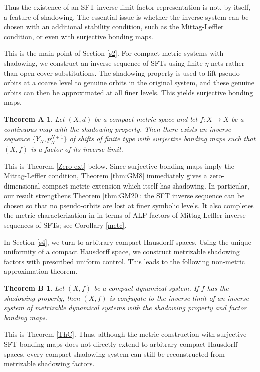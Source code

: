\documentclass[10pt,a4paper]{amsart}
\numberwithin{equation}{section}
\newtheorem*{theoremA}{Theorem A}
\newtheorem*{theoremB}{Theorem B}
\begin{document}
Thus the existence of an SFT inverse-limit factor representation is not, by
itself, a feature of shadowing. The essential issue is whether the inverse system
can be chosen with an additional stability condition, such as the
Mittag-Leffler condition, or even with surjective bonding maps.

This is the main point of Section \ref{s2}. For compact metric systems with
shadowing, we construct an inverse sequence of SFTs using finite $\eta$-nets
rather than open-cover substitutions. The shadowing property is used to lift
pseudo-orbits at a coarse level to genuine orbits in the original system, and
these genuine orbits can then be approximated at all finer levels. This yields
surjective bonding maps.

\begin{theoremA}
\emph{Let $(X,d)$ be a compact metric space and let $f:X\to X$ be a continuous map
with the shadowing property. Then there exists an inverse sequence
$\{Y_N,p_N^{N+1}\}$ of shifts of finite type with surjective bonding maps such
that $(X,f)$ is a factor of its inverse limit.}
\end{theoremA}

This is Theorem \ref{Zero-ext} below. Since surjective bonding maps imply the
Mittag-Leffler condition, Theorem \ref{thm:GM8} immediately gives a
zero-dimensional compact metric extension which itself has shadowing. In
particular, our result strengthens Theorem \ref{thm:GM20}: the SFT inverse
sequence can be chosen so that no pseudo-orbits are lost at finer symbolic
levels. It also completes the metric characterization in \cite[Corollary 28]{GM}
in terms of ALP factors of Mittag-Leffler inverse sequences of SFTs; see
Corollary \ref{metc}.

In Section \ref{s4}, we turn to arbitrary compact Hausdorff spaces.
Using the unique uniformity of a compact Hausdorff space, we construct metrizable
shadowing factors with prescribed uniform control. This leads to the following
non-metric approximation theorem.

\begin{theoremB}
\emph{Let $(X,f)$ be a compact dynamical system. If $f$ has the shadowing property,
then $(X,f)$ is conjugate to the inverse limit of an inverse system of
metrizable dynamical systems with the shadowing property and factor bonding
maps.}
\end{theoremB}

This is Theorem \ref{ThC}. Thus, although the metric construction with
surjective SFT bonding maps does not directly extend to arbitrary compact
Hausdorff spaces, every compact shadowing system can still be reconstructed from
metrizable shadowing factors.
\end{document}
